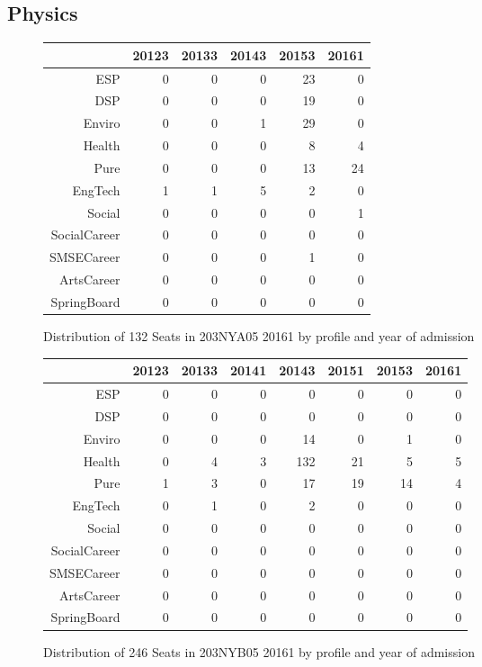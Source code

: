 \documentclass{article}\usepackage[]{graphicx}\usepackage[]{color}
\begin{document}
\subsection{Physics}
\begin{figure}[H]
\centering
\begin{tabular}{rrrrrr}
  \hline
 & 20123 & 20133 & 20143 & 20153 & 20161 \\ 
  \hline
ESP &   0 &   0 &   0 &  23 &   0 \\ 
  DSP &   0 &   0 &   0 &  19 &   0 \\ 
  Enviro &   0 &   0 &   1 &  29 &   0 \\ 
  Health &   0 &   0 &   0 &   8 &   4 \\ 
  Pure &   0 &   0 &   0 &  13 &  24 \\ 
  EngTech &   1 &   1 &   5 &   2 &   0 \\ 
  Social &   0 &   0 &   0 &   0 &   1 \\ 
  SocialCareer &   0 &   0 &   0 &   0 &   0 \\ 
  SMSECareer &   0 &   0 &   0 &   1 &   0 \\ 
  ArtsCareer &   0 &   0 &   0 &   0 &   0 \\ 
  SpringBoard &   0 &   0 &   0 &   0 &   0 \\ 
   \hline
\end{tabular}
\caption{Distribution of 132 Seats in 203NYA05 20161 by profile and year of admission} 
\end{figure}
\begin{figure}[H]
\centering
\begin{tabular}{rrrrrrrr}
  \hline
 & 20123 & 20133 & 20141 & 20143 & 20151 & 20153 & 20161 \\ 
  \hline
ESP &   0 &   0 &   0 &   0 &   0 &   0 &   0 \\ 
  DSP &   0 &   0 &   0 &   0 &   0 &   0 &   0 \\ 
  Enviro &   0 &   0 &   0 &  14 &   0 &   1 &   0 \\ 
  Health &   0 &   4 &   3 & 132 &  21 &   5 &   5 \\ 
  Pure &   1 &   3 &   0 &  17 &  19 &  14 &   4 \\ 
  EngTech &   0 &   1 &   0 &   2 &   0 &   0 &   0 \\ 
  Social &   0 &   0 &   0 &   0 &   0 &   0 &   0 \\ 
  SocialCareer &   0 &   0 &   0 &   0 &   0 &   0 &   0 \\ 
  SMSECareer &   0 &   0 &   0 &   0 &   0 &   0 &   0 \\ 
  ArtsCareer &   0 &   0 &   0 &   0 &   0 &   0 &   0 \\ 
  SpringBoard &   0 &   0 &   0 &   0 &   0 &   0 &   0 \\ 
   \hline
\end{tabular}
\caption{Distribution of 246 Seats in 203NYB05 20161 by profile and year of admission} 
\end{figure}
\end{document}
